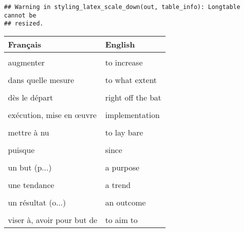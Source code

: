 \documentclass[
  10pt,
]{article}
\begin{document}
\begin{verbatim}
## Warning in styling_latex_scale_down(out, table_info): Longtable cannot be
## resized.
\end{verbatim}

\begin{longtable}{ll}
\toprule
Français & English\\
\midrule
\cellcolor{gray!6}{aborder un problème} & \cellcolor{gray!6}{to address an issue}\\

augmenter & to increase\\

\cellcolor{gray!6}{bien que} & \cellcolor{gray!6}{although}\\

dans quelle mesure & to what extent\\

\cellcolor{gray!6}{de plus} & \cellcolor{gray!6}{furthermore}\\

dès le départ & right off the bat\\

\cellcolor{gray!6}{en dépit de} & \cellcolor{gray!6}{despite}\\

exécution, mise en œuvre & implementation\\

\cellcolor{gray!6}{les résultats} & \cellcolor{gray!6}{the findings}\\

mettre à nu & to lay bare\\

\cellcolor{gray!6}{pertinent} & \cellcolor{gray!6}{relevant}\\

puisque & since\\

\cellcolor{gray!6}{se concentrer sur} & \cellcolor{gray!6}{to focus on}\\

un but (p...) & a purpose\\

\cellcolor{gray!6}{un échantillon} & \cellcolor{gray!6}{a sample}\\

une tendance & a trend\\

\cellcolor{gray!6}{un moyen de} & \cellcolor{gray!6}{a means to}\\

un résultat (o...) & an outcome\\

\cellcolor{gray!6}{un résumé} & \cellcolor{gray!6}{a summary}\\

viser à, avoir pour but de & to aim to\\
\bottomrule
\end{longtable}
\end{document}
